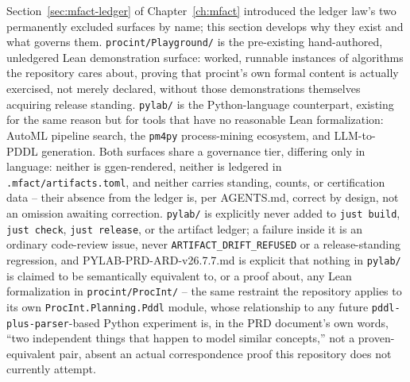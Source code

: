 Section~\ref{sec:mfact-ledger} of Chapter~\ref{ch:mfact} introduced the
ledger law's two permanently excluded surfaces by name;
this section develops why they exist and what governs them.
\texttt{procint/Playground/} is the pre-existing hand-authored, unledgered
Lean demonstration surface: worked, runnable instances of algorithms the
repository cares about, proving that \textsf{procint}'s own formal
content is actually exercised, not merely declared, without those
demonstrations themselves acquiring release standing. \texttt{pylab/} is
the Python-language counterpart, existing for the same reason but for
tools that have no reasonable Lean formalization: AutoML pipeline
search, the \texttt{pm4py} process-mining ecosystem, and LLM-to-PDDL
generation. Both surfaces share a governance tier, differing only in
language: neither is ggen-rendered, neither is ledgered in
\texttt{.mfact/artifacts.toml}, and neither carries standing, counts, or
certification data -- their absence from the ledger is, per AGENTS.md,
correct by design, not an omission awaiting correction. \texttt{pylab/}
is explicitly never added to \texttt{just build}, \texttt{just check},
\texttt{just release}, or the artifact ledger; a failure inside it is an
ordinary code-review issue, never \texttt{ARTIFACT\_DRIFT\_REFUSED} or a
release-standing regression, and PYLAB-PRD-ARD-v26.7.7.md is explicit
that nothing in \texttt{pylab/} is claimed to be semantically equivalent
to, or a proof about, any Lean formalization in
\texttt{procint/ProcInt/} -- the same restraint the repository applies to
its own \texttt{ProcInt.Planning.Pddl} module, whose relationship to any
future \texttt{pddl-plus-parser}-based Python experiment is, in the PRD
document's own words, ``two independent things that happen to model
similar concepts,'' not a proven-equivalent pair, absent an actual
correspondence proof this repository does not currently attempt.

